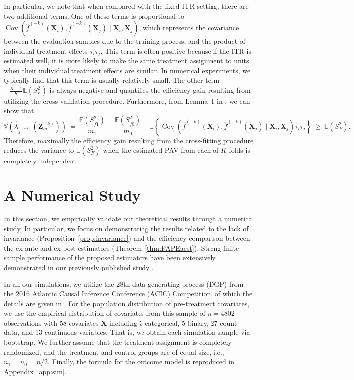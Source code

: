 \documentclass[USenglish,onecolumn]{article}
\DeclareMathOperator\Cov{Cov}
\renewcommand\r{\right}
\renewcommand\l{\left}
\newcommand\E{\mathbb{E}}
\newcommand\V{\mathbb{V}}
\newcommand\bX{\bm{X}}
\newcommand\bZ{\bm{Z}}
\begin{document}
In particular, we note that when compared with the fixed ITR setting,
there are two additional terms. One of these terms is proportional to
$\Cov(\hat{f}^{(-k)}(\bX_i), \hat{f}^{(-k)}(\bX_j) \mid \bX_i,
\bX_j)$, which represents the covariance between the evaluation
samples due to the training process, and the product of individual
treatment effects $\tau_i\tau_j$.  This term is often positive because
if the ITR is estimated well, it is more likely to make the same
treatment assignment to units when their individual treatment effects
are similar.  In numerical experiments, we typically find that this
term is usually relatively small. The other term
$- \frac{K-1}{K}\E(S_{F}^2)$ is always negative and quantifies the
efficiency gain resulting from utilizing the cross-validation
procedure. Furthermore, from Lemma~1 in \cite{nadeau2003inference}, we
can show that
\begin{equation*}
	\V(\hat{\lambda}_{\hat{f}^{(-k)}}(\bZ_m^{(k)})) \ = \
	\frac{\E(S_{\hat{f}1}^2)}{m_1} +
	\frac{\E(S_{\hat{f}0}^2)}{m_0}
	+\E \l\{\Cov(\hat{f}^{(-k)}(\bX_i),
	\hat{f}^{(-k)}(\bX_j) \mid
	\bX_i, \bX_j)\tau_i\tau_j\r\} \ \geq \ \E(S_{F}^2).
\end{equation*}
Therefore, maximally the efficiency gain resulting from the
cross-fitting procedure reduces the variance to $\E(S^2_F)$ when the
estimated PAV from each of $K$ folds is completely independent. 

\section{A Numerical Study}

In this section, we empirically validate our theoretical results
through a numerical study. In particular, we focus on demonstrating
the results related to the lack of invariance
(Proposition~\ref{prop:invariance}) and the efficiency comparison
between the ex-ante and ex-post estimators
(Theorem~\ref{thm:PAPEaest}).  Strong finite-sample performance of the
proposed estimators have been extensively demonstrated in our
previously published study \citep{imai2021experimental}.

In all our simulations, we utilize the 28th data generating process
(DGP) from the 2016 Atlantic Causal Inference Conference (ACIC)
Competition, of which the details are given in \cite{dori:etal:19}.
For the population distribution of pre-treatment covariates, we use
the empirical distribution of covariates from this sample of $n=4802$
observations with 58 covariates $\bX$ including 3 categorical, 5
binary, 27 count data, and 13 continuous variables. That is, we obtain
each simulation sample via bootstrap. We further assume that the
treatment assignment is completely randomized, and the treatment and
control groups are of equal size, i.e., $n_1=n_0=n/2$.  Finally, the
formula for the outcome model is reproduced in Appendix~\ref{app:sim}.
\end{document}
